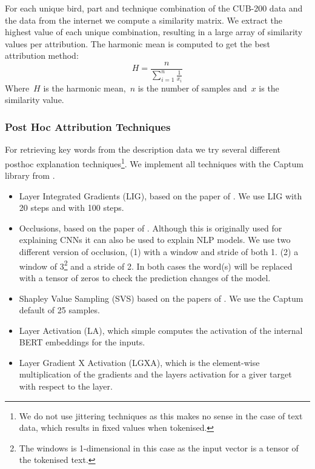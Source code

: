 \documentclass[a4paper, 12pt, oneside]{book} %
\begin{document}
For each unique bird, part and technique combination of the CUB-200 data and the data from the internet we compute a similarity matrix.
We extract the highest value of each unique combination, resulting in a large array of similarity values per attribution.
The harmonic mean is computed to get the best attribution method:
\begin{equation}
    H = \frac{n}{\sum\limits_{i=1}^n \frac1{x_i}}
\end{equation}
Where~$H$ is the harmonic mean,~$n$ is the number of samples and~$x$ is the similarity value. 




\subsubsection{Post Hoc Attribution Techniques} \label{par:attribution}
For retrieving key words from the description data we try several different posthoc explanation techniques\footnote{We do not use jittering techniques as this makes no sense in the case of text data, which results in fixed values when tokenised. }. 
We implement all techniques with the Captum library from \textcite{kokhlikyan_captum_2020}.
\begin{itemize}
    \item Layer Integrated Gradients (LIG), based on the paper of \textcite{sundararajan_axiomatic_2017}. We use LIG with 20 steps and with 100 steps.
    \item Occlusions, based on the paper of \textcite{fleet_visualizing_2014}. Although this is originally used for explaining CNNs it can also be used to explain NLP models. We use two different version of occlusion, (1) with a window and stride of both 1. (2) a window of 3\footnote{The windows is 1-dimensional in this case as the input vector is a tensor of the tokenised text.} and a stride of 2. In both cases the word(s) will be replaced with a tensor of zeros to check the prediction changes of the model. 
    \item Shapley Value Sampling (SVS) based on the papers of \textcite{castro_polynomial_2009, strumbelj_efficient_2010}. We use the Captum default of 25 samples.
    \item Layer Activation (LA), which simple computes the activation of the internal BERT embeddings for the inputs.
    \item Layer Gradient X Activation (LGXA), which is the element-wise multiplication of the gradients and the layers activation for a giver target with respect to the layer.
\end{itemize}
\end{document}
